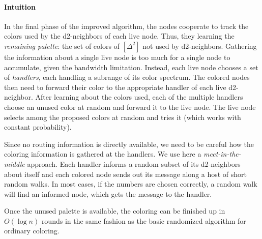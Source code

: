 \paragraph*{Intuition}
In the final phase of the improved algorithm, the nodes cooperate to track the colors used by the d2-neighbors of each live node. Thus, they learning the \emph{remaining palette}: the set of colors of $[\Delta^2]$ not used by d2-neighbors. Gathering the information about a single live node is too much for a single node to accumulate, given the bandwidth limitation. Instead, each live node chooses a set of \emph{handlers}, each handling a subrange of its color spectrum. The colored nodes then need to forward their color to the appropriate handler of each live d2-neighbor. After learning about the colors used, each of the multiple handlers choose an unused color at random and forward it to the live node. The live node selects among the proposed colors at random and tries it (which works with constant probability).

Since no routing information is directly available, we need to be careful how the coloring information is gathered at the handlers. We use here a \emph{meet-in-the-middle} approach. Each handler informs a random subset of its d2-neighbors about itself and each colored node sends out its message along a host of short random walks. In most cases, if the numbers are chosen correctly, a random walk will find an informed node, which gets the message to the handler. 

Once the unused palette is available, the coloring can be finished up in $O(\log n)$ rounds in the same fashion as the basic randomized {\congest} algorithm for ordinary coloring.

